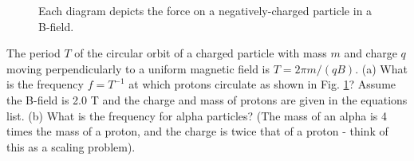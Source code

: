 \documentclass[10pt]{article}
\begin{document}
\begin{enumerate}
\begin{enumerate}
\begin{figure}[hb]
\caption{\label{fig:cyclo} Each diagram depicts the force on a negatively-charged particle in a B-field.}
\end{figure}
The period $T$ of the circular orbit of a charged particle with mass $m$ and charge $q$ moving perpendicularly to a uniform magnetic field is $T = 2\pi m/(qB)$. (a) What is the frequency $f = T^{-1}$ at which protons circulate as shown in Fig. \ref{fig:cyclo}? Assume the B-field is 2.0 T and the charge and mass of protons are given in the equations list.  (b) What is the frequency for alpha particles?  (The mass of an alpha is 4 times the mass of a proton, and the charge is twice that of a proton - think of this as a scaling problem).
\end{enumerate}
\end{enumerate}
\end{document}
